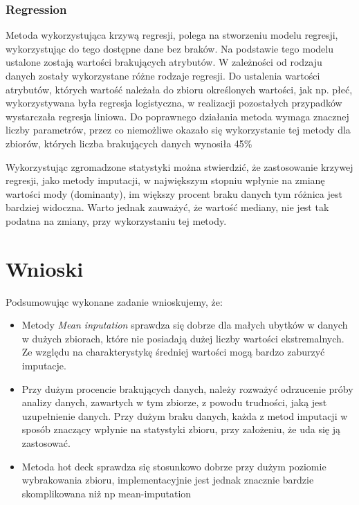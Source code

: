\documentclass{classrep}
\begin{document}
{{        }

        \subsubsection{Regression}
        \label{summary:regression} {
            Metoda wykorzystująca krzywą regresji, polega na stworzeniu modelu regresji, wykorzystując do tego dostępne dane bez braków. Na podstawie tego modelu ustalone zostają wartości brakujących atrybutów. W zależności od rodzaju danych zostały wykorzystane różne rodzaje regresji. Do ustalenia wartości atrybutów, których wartość należała do zbioru określonych wartości, jak np. płeć, wykorzystywana była regresja logistyczna, w realizacji pozostałych przypadków wystarczała regresja liniowa. Do poprawnego działania metoda wymaga znacznej liczby parametrów, przez co niemożliwe okazało się wykorzystanie tej metody dla zbiorów, których liczba brakujących danych wynosiła 45\%
            
            Wykorzystując zgromadzone statystyki można stwierdzić, że zastosowanie krzywej regresji, jako metody imputacji, w największym stopniu wpłynie na zmianę wartości mody (dominanty), im większy procent braku danych tym różnica jest bardziej widoczna. Warto jednak zauważyć, że wartość mediany, nie jest tak podatna na zmiany, przy wykorzystaniu tej metody.
        }

    }

    \section{Wnioski}
    \label{conclusions} {
        Podsumowując wykonane zadanie wnioskujemy, że:
        \begin{itemize}
            \item Metody \textit{Mean inputation} sprawdza się dobrze dla małych ubytków 
            w danych w dużych zbiorach, które nie posiadają dużej liczby wartości 
            ekstremalnych. Ze względu na charakterystykę średniej wartości mogą bardzo 
            zaburzyć imputacje.
            \item Przy dużym procencie brakujących danych, należy rozważyć odrzucenie próby analizy danych, zawartych w tym zbiorze, z powodu trudności, jaką jest uzupełnienie danych. Przy dużym braku danych, każda z metod imputacji w sposób znaczący wpłynie na statystyki zbioru, przy założeniu, że uda się ją zastosować.
            \item Metoda hot deck sprawdza się stosunkowo dobrze przy dużym poziomie wybrakowania zbioru, implementacyjnie jest jednak znacznie bardzie skomplikowana niż np mean-imputation

        \end{itemize}
    }

    \begin{thebibliography}{0}
    \end{thebibliography}
\end{document}
